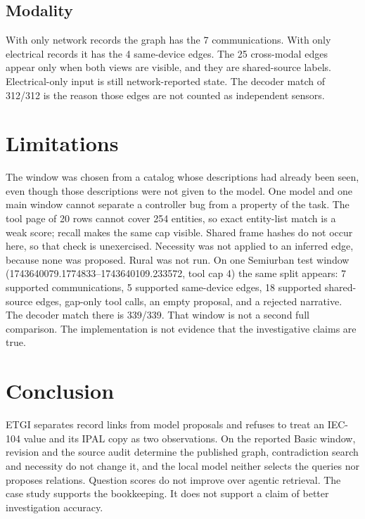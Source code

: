 \documentclass[conference]{IEEEtran}
\begin{document}
\subsection{Modality}
With only network records the graph has the 7 communications.
With only electrical records it has the 4 same-device edges.
The 25 cross-modal edges appear only when both views are visible, and they are shared-source labels.
Electrical-only input is still network-reported state.
The decoder match of 312/312 is the reason those edges are not counted as independent sensors.

\section{Limitations}
The window was chosen from a catalog whose descriptions had already been seen, even though those descriptions were not given to the model.
One model and one main window cannot separate a controller bug from a property of the task.
The tool page of 20 rows cannot cover 254 entities, so exact entity-list match is a weak score; recall makes the same cap visible.
Shared frame hashes do not occur here, so that check is unexercised.
Necessity was not applied to an inferred edge, because none was proposed.
Rural was not run.
On one Semiurban test window (1743640079.1774833--1743640109.233572, tool cap 4) the same split appears: 7 supported communications, 5 supported same-device edges, 18 supported shared-source edges, gap-only tool calls, an empty proposal, and a rejected narrative.
The decoder match there is 339/339.
That window is not a second full comparison.
The implementation is not evidence that the investigative claims are true.

\section{Conclusion}
ETGI separates record links from model proposals and refuses to treat an IEC-104 value and its IPAL copy as two observations.
On the reported Basic window, revision and the source audit determine the published graph, contradiction search and necessity do not change it, and the local model neither selects the queries nor proposes relations.
Question scores do not improve over agentic retrieval.
The case study supports the bookkeeping.
It does not support a claim of better investigation accuracy.



\end{document}
